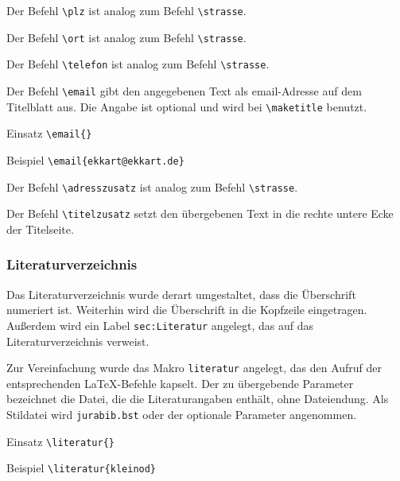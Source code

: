 \DescribeMacro{\plz}
Der Befehl \verb#\plz# ist analog zum Befehl \verb#\strasse#.

\DescribeMacro{\ort}
Der Befehl \verb#\ort# ist analog zum Befehl \verb#\strasse#.

\DescribeMacro{\telefon}
Der Befehl \verb#\telefon# ist analog zum Befehl \verb#\strasse#.

\DescribeMacro{\email}
Der Befehl \verb#\email# gibt den angegebenen Text als email-Adresse
auf dem Titelblatt aus.
Die Angabe ist optional und wird bei \verb#\maketitle# benutzt.
\begin{einspiel}{Einsatz}
 \>\verb#\email{#\verb#}#
\end{einspiel}
\begin{einspiel}{Beispiel}
 \>\verb#\email{ekkart@ekkart.de}#
\end{einspiel}

\DescribeMacro{\adresszusatz}
Der Befehl \verb#\adresszusatz# ist analog zum Befehl \verb#\strasse#.

\DescribeMacro{\titelzusatz}
Der Befehl \verb#\titelzusatz# setzt den übergebenen Text in
die rechte untere Ecke der Titelseite.

\subsubsection{Literaturverzeichnis}
\label{sec:New:Literatur}

Das Literaturverzeichnis wurde derart umgestaltet, dass die Überschrift numeriert ist.
Weiterhin wird die Überschrift in die Kopfzeile eingetragen.
Außerdem wird ein Label \verb#sec:Literatur# angelegt,
das auf das Literaturverzeichnis verweist.

\DescribeMacro{\literatur}
Zur Vereinfachung wurde das Makro
\verb#literatur# angelegt, das den Aufruf der entsprechenden \LaTeX-Befehle kapselt.
Der zu übergebende Parameter bezeichnet die Datei, die die Literaturangaben
enthält, ohne Dateiendung.
Als Stildatei wird \verb#jurabib.bst# oder der optionale Parameter angenommen.
\begin{einspiel}{Einsatz}
 \>\verb#\literatur{#\verb#}#
\end{einspiel}
\begin{einspiel}{Beispiel}
 \>\verb#\literatur{kleinod}#
\end{einspiel}

